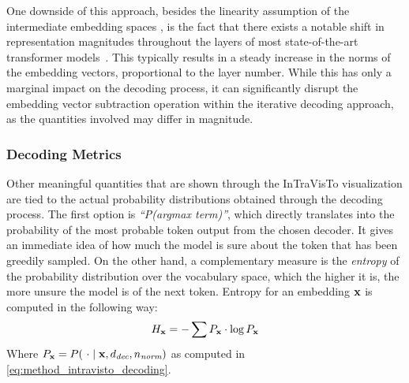 One downside of this approach, besides the linearity assumption of the intermediate embedding spaces , is the fact that there exists a notable shift in representation magnitudes throughout the layers of most state-of-the-art transformer models~\cite{heimersheim2023}.
This typically results in a steady increase in the norms of the embedding vectors, proportional to the layer number.
While this has only a marginal impact on the decoding process, it can significantly disrupt the embedding vector subtraction operation within the iterative decoding approach, as the quantities involved may differ in magnitude.

\subsubsection{Decoding Metrics}\label{sssec:method_intravisto_decoding_metrics}

Other meaningful quantities that are shown through the InTraVisTo visualization are tied to the actual probability distributions obtained through the decoding process.
The first option is \emph{``P(argmax term)''}, which directly translates into the probability of the most probable token output from the chosen decoder.
It gives an immediate idea of how much the model is sure about the token that has been greedily sampled.
On the other hand, a complementary measure is the \emph{entropy} of the probability distribution over the vocabulary space, which the higher it is, the more unsure the model is of the next token.
Entropy for an embedding $\bm{\mathbf{x}}$ is computed in the following way:
\begin{equation*}
    \label{eq:method_intravisto_entropy}
    H_{\bm{\mathbf{x}}} = -\sum{P_{\bm{\mathbf{x}}} \cdot \log{P_{\bm{\mathbf{x}}}}}
\end{equation*}
Where $P_{\bm{\mathbf{x}}} = P(\ \cdot \mid \bm{\mathbf{x}}, d_\textit{dec}, n_\textit{norm})$ as computed in \cref{eq:method_intravisto_decoding}.

